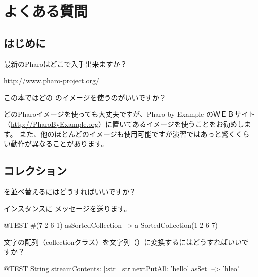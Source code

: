 \documentclass[a4paper,10pt,twoside]{book}
\begin{document}
	\renewcommand{\nnbb}[2]{} %
	\sloppy
\fi
\chapter{よくある質問}
\label{app:faq}


\section{はじめに}
\begin{faq}
最新のPharoはどこで入手出来ますか？
\end{faq}
\answer
\url{http://www.pharo-project.org/}

\begin{faq}
この本ではどの \pharo のイメージを使うのがいいですか？
\end{faq}
\answer
どのPharoイメージを使っても大丈夫ですが、Pharo by Example のＷＥＢサイト（\url{http://PharoByExample.org}）に置いてあるイメージを使うことをお勧めします。
また、他のほとんどのイメージも使用可能ですが演習ではあっと驚くくらい動作が異なることがあります。

\section{コレクション}

\begin{faq}
 を並べ替えるにはどうすればいいですか？
\end{faq}
\answer
インスタンスに  メッセージを送ります。

\begin{code}{@TEST}
#(7 2 6 1) asSortedCollection --> a SortedCollection(1 2 6 7)
\end{code}

\begin{faq}
文字の配列（collectionクラス）を文字列（）に変換するにはどうすればいいですか？
\end{faq}
\answer
\begin{code}{@TEST}
String streamContents: [:str | str nextPutAll: 'hello' asSet] --> 'hleo'
\end{code}
\end{document}

